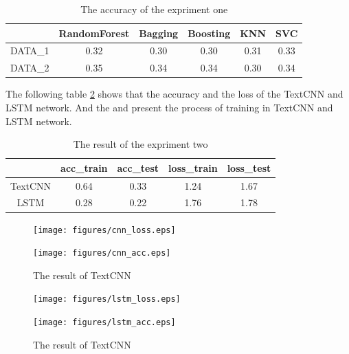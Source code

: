 \begin{table} [htbp] \centering
  \caption{The accuracy of the expriment one}
  \label{tbl:overall-experiments}
  \begin{tabular}{cccccc}
\toprule
 & RandomForest  & Bagging & Boosting & KNN & SVC\\
\midrule
DATA\_1&  0.32 &  0.30 &  0.30 & 0.31 & 0.33\\
DATA\_2 &  0.35 &  0.34 &  0.34 & 0.30 & 0.34\\
\bottomrule
\end{tabular}
\end{table}

The following table \cref{tbl:exp_two} shows that
the accuracy and the loss of 
the TextCNN and LSTM network.
And the  and 
 present the 
process of training in 
TextCNN and LSTM network.


\begin{table} [htbp] \centering
	\caption{The result of the expriment two}
	\label{tbl:exp_two}
	\begin{tabular}{ccccc}
	\toprule
	& acc_train  & acc_test & loss_train & loss_test \\
	\midrule
	TextCNN&  0.64 &  0.33 &  1.24 & 1.67 \\
	LSTM &  0.28 &  0.22 &  1.76 & 1.78 \\
	\bottomrule
	\end{tabular}
\end{table}

\begin{figure}[htbp]
	\centering
	\label{fig:cnn_reuslt}
	\begin{minipage}[c]{0.5\textwidth}
		\centering
		\texttt{[image: figures/cnn\_loss.eps]}
	\end{minipage}%
	\begin{minipage}[c]{0.5\textwidth}
		\centering
		\texttt{[image: figures/cnn\_acc.eps]}
	\end{minipage}
	\caption{The result of TextCNN}
\end{figure}

\begin{figure}[htbp]
	\centering
	\label{fig:lstm_reuslt}
	\begin{minipage}[c]{0.5\textwidth}
		\centering
		\texttt{[image: figures/lstm\_loss.eps]}
	\end{minipage}%
	\begin{minipage}[c]{0.5\textwidth}
		\centering
		\texttt{[image: figures/lstm\_acc.eps]}
	\end{minipage}
	\caption{The result of TextCNN}
\end{figure}

